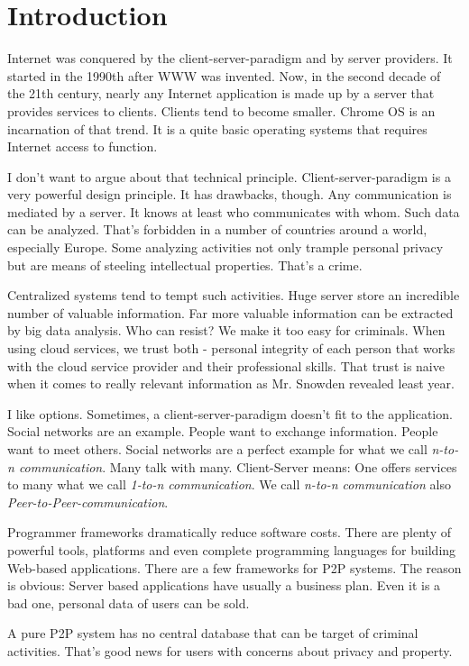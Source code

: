 \chapter{Introduction}
Internet was conquered by the client-server-paradigm and by server providers. It started in the 1990th after WWW was invented. Now, in the second decade of the 21th century, nearly any Internet application is made up by a server that provides services to clients. Clients tend to become smaller. Chrome OS is an incarnation of that trend. It is a quite basic operating systems that requires Internet access to function.

I don't want to argue about that technical principle. Client-server-paradigm is a very powerful design principle. It has drawbacks, though. Any communication is mediated by a server. It knows at least who communicates with whom. Such data can be analyzed. That's forbidden in a number of countries around a world, especially Europe. Some analyzing activities not only trample personal privacy but are means of steeling intellectual properties. That's a crime.

Centralized systems tend to tempt such activities. Huge server store an incredible number of valuable information. Far more valuable information can be extracted by big data analysis. Who can resist? We make it too easy for criminals. When using cloud services, we trust both - personal integrity of each person that works with the cloud service provider and their professional skills. That trust is naive when it comes to really relevant information as Mr. Snowden revealed least year.

I like options. Sometimes, a client-server-paradigm doesn't fit to the application. Social networks are an example. People want to exchange information. People want to meet others. Social networks are a perfect example for what we call {\it n-to-n communication}. Many talk with many. Client-Server means: One offers services to many what we call {\it 1-to-n communication}.
We call {\it n-to-n communication} also {\it Peer-to-Peer-communication}.

Programmer frameworks dramatically reduce software costs. There are plenty of powerful tools, platforms and even complete programming languages for building Web-based applications. There are a few frameworks for P2P systems. The reason is obvious: Server based applications have usually a business plan. Even it is a bad one, personal data of users can be sold. 

A pure P2P system has no central database that can be target of criminal activities. That's good news for users with concerns about privacy and property. 

